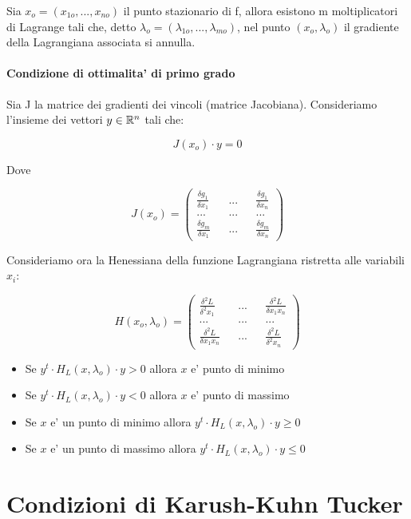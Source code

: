 Sia $x_o = (x_{1o},...,x_{no})$ il punto stazionario di f, allora esistono m moltiplicatori di Lagrange tali che, detto $\lambda_o = (\lambda_{1o},...,\lambda_{mo})$, nel punto $(x_o,\lambda_o)$ il gradiente della Lagrangiana associata si annulla.

\paragraph{Condizione di ottimalita' di primo grado}

Sia J la matrice dei gradienti dei vincoli (matrice Jacobiana).
Consideriamo l'insieme dei vettori $y \in \mathbb{R}^n$ tali che:

\[ J(x_o) \cdot y = 0 \]

Dove

\[
    J(x_o) =
    \begin{pmatrix}
        \frac {\delta g_1} {\delta x_1} && ... && \frac {\delta g_1} {\delta x_n} \\
        ... && ... && ... \\
        \frac {\delta g_m} {\delta x_1} && ... && \frac {\delta g_m} {\delta x_n}
    \end{pmatrix}
\]

Consideriamo ora la Henessiana della funzione Lagrangiana ristretta alle variabili $x_i$:

\[
    H(x_o, \lambda_o) =
    \begin{pmatrix}
        \frac {\delta^2 L} {\delta^2 x_1} && ... && \frac {\delta^2 L} {\delta x_1 x_n} \\
        ... && ... && ... \\
        \frac {\delta^2 L} {\delta x_1 x_n} && ... && \frac {\delta^2 L} {\delta^2 x_n}
    \end{pmatrix}
\]

\begin{itemize}
    \item Se $y^t \cdot H_L(x,\lambda_o) \cdot y > 0$ allora $x$ e' punto di minimo
    \item Se $y^t \cdot H_L(x,\lambda_o) \cdot y < 0$ allora $x$ e' punto di massimo
    \item Se $x$ e' un punto di minimo allora $y^t \cdot H_L(x,\lambda_o) \cdot y \geq 0$
    \item Se $x$ e' un punto di massimo allora $y^t \cdot H_L(x,\lambda_o) \cdot y \leq 0$
\end{itemize}

\section{Condizioni di Karush-Kuhn Tucker}

